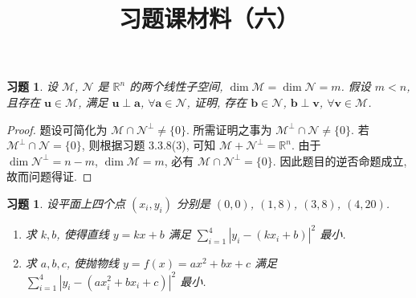 \documentclass[UTF8]{ctexart}
\newtheorem{ex}[thm]{习题}
\begin{document}
\title{习题课材料（六）}
\date{}

\maketitle


\begin{ex}
  设 \(\mathcal{M}\), \(\mathcal{N}\) 是 \(\mathbb{R}^{n}\) 的两个线性子空间,
  \(\dim \mathcal{M} = \dim \mathcal{N} = m\). 假设 \(m < n\), 且存在
  \(\boldsymbol{u} \in \mathcal{M}\), 满足 \(\boldsymbol{u} \perp \boldsymbol{a}\), \(\forall\boldsymbol{a} \in \mathcal{N}\),
  证明, 存在 \(\boldsymbol{b} \in \mathcal{N}\), \(\boldsymbol{b} \perp \boldsymbol{v}\), \(\forall \boldsymbol{v} \in \mathcal{M}\).
\end{ex}

\begin{proof}
  题设可简化为 \(\mathcal{M} \cap \mathcal{N}^{\perp} \neq \{0\}\).
  所需证明之事为 \(\mathcal{M}^{\perp} \cap \mathcal{N} \neq \{0\}\).
  若 \(\mathcal{M}^{\perp}\cap \mathcal{N} = \{0\}\),
  则根据习题 3.3.8(3), 可知 \(\mathcal{M} + \mathcal{N}^{\perp} = \mathbb{R}^{n}\).
  由于 \(\dim \mathcal{N}^{\perp} = n - m\), \(\dim \mathcal{M} = m\), 必有
  \(\mathcal{M} \cap \mathcal{N}^{\perp} = \{0\}\).
  因此题目的逆否命题成立, 故而问题得证.
\end{proof}

\begin{ex}
  设平面上四个点 \((x_i,y_i)\) 分别是
  \((0,0)\), \((1,8)\), \((3,8)\), \((4,20)\).
  \begin{enumerate}
  \item 求 \(k, b\), 使得直线 \(y = kx + b\) 满足
    \(\sum_{i=1}^{4}|y_i - (kx_i+b)|^2\) 最小.
  \item 求 \(a,b,c\), 使抛物线 \(y = f(x) = ax^2 + bx + c\) 满足
    \(\sum_{i=1}^{4}|y_i - (ax_i^2+bx_i + c)|^2\) 最小.
  \end{enumerate}
\end{ex}
\end{document}
